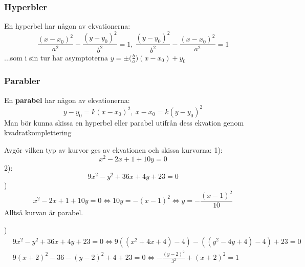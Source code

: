 \documentclass{report}
\begin{document}
\pagebreak
\subsubsection{Hyperbler}
En hyperbel har någon av ekvationerna:
\begin{equation*}
\frac{(x-x_0)^2}{a^2} - \frac{(y-y_0)^2}{b^2} = 1,\: \frac{(y-y_0)^2}{b^2} - \frac{(x-x_0)^2}{a^2} = 1
\end{equation*}
...som i sin tur har asymptoterna $ y = \pm \bigl( \frac{b}{a}   \bigr)(x-x_0) +y_0$\\ 

\subsubsection{Parabler}
En \textbf{parabel} har någon av ekvationerna:
\begin{equation*}
y - y_0 = k(x-x_0)^2,\: x - x_0 = k(y-y_0)^2
\end{equation*}
Man bör kunna skissa en hyperbel eller parabel utifrån dess ekvation genom kvadratkomplettering

\vspace{20pt}
\qs{}
{
Avgör vilken typ av kurvor ges av ekvationen och skissa kurvorna:
1):
\begin{equation*}
x^2-2x+1+10y=0
\end{equation*}
2):
\begin{equation*}
9x^2-y^2+36x+4y+23 = 0
\end{equation*}
}
)
\begin{equation*}
x^2-2x+1+10y = 0 \iff 10y = -(x-1)^2 \iff y = - \frac{(x-1)^2}{10}  
\end{equation*}
Alltså kurvan är parabel.

)
\begin{align*}
&9x^2-y^2+36x+4y+23 = 0 \iff 9((x^2+4x+4)-4) -((y^2-4y+4)-4)+23 = 0 \\
&9(x+2)^2-36-(y-2)^2+4+23 = 0 \iff -\frac{(y-2)^2}{3^2} + (x+2)^2 = 1 
\end{align*}
\end{document}
